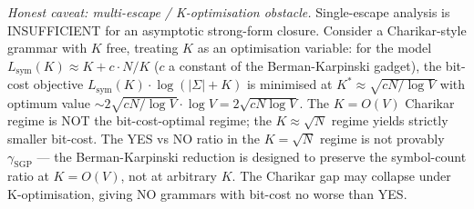 \documentclass[
]{article}
\begin{document}
\begin{itemize}
  \emph{Honest caveat: multi-escape / K-optimisation obstacle.}
  Single-escape analysis is INSUFFICIENT for an asymptotic strong-form
  closure. Consider a Charikar-style grammar with $K$ free, treating
  $K$ as an optimisation variable: for the model $L_{\mathrm{sym}}(K)
  \approx K + c \cdot N/K$ ($c$ a constant of the Berman-Karpinski
  gadget), the bit-cost objective $L_{\mathrm{sym}}(K) \cdot \log(|\Sigma|+K)$
  is minimised at $K^* \approx \sqrt{cN/\log V}$ with optimum value
  $\sim 2\sqrt{cN/\log V} \cdot \log V = 2\sqrt{cN \log V}$. The
  $K = O(V)$ Charikar regime is NOT the bit-cost-optimal regime; the
  $K \approx \sqrt{N}$ regime yields strictly smaller bit-cost. The
  YES vs NO ratio in the $K = \sqrt{N}$ regime is not provably
  $\gamma_{\mathrm{SGP}}$ --- the Berman-Karpinski reduction is
  designed to preserve the symbol-count ratio at $K = O(V)$, not at
  arbitrary $K$. The Charikar gap may collapse under K-optimisation,
  giving NO grammars with bit-cost no worse than YES.


\end{itemize}
\end{document}
